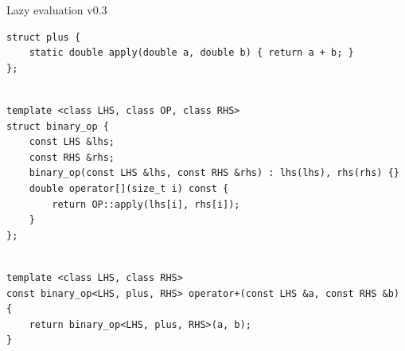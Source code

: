\documentclass[@BEAMER_OPTIONS@]{beamer}
\begin{document}
\begin{frame}[fragile]{Lazy evaluation v0.3}
    \begin{exampleblock}{}
        \begin{lstlisting}
struct plus {
    static double apply(double a, double b) { return a + b; }
};
        \end{lstlisting}
        \pause
        \begin{lstlisting}[firstnumber=last]

template <class LHS, class OP, class RHS>
struct binary_op {
    const LHS &lhs;
    const RHS &rhs;
    binary_op(const LHS &lhs, const RHS &rhs) : lhs(lhs), rhs(rhs) {}
    double operator[](size_t i) const {
        return OP::apply(lhs[i], rhs[i]);
    }
};
        \end{lstlisting}
        \pause
        \begin{lstlisting}[firstnumber=last]

template <class LHS, class RHS>
const binary_op<LHS, plus, RHS> operator+(const LHS &a, const RHS &b) {
    return binary_op<LHS, plus, RHS>(a, b);
}
        \end{lstlisting}
    \end{exampleblock}
\end{frame}

\note{ }
\end{document}
